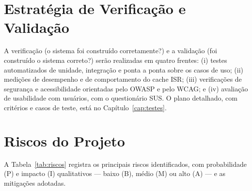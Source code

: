\section{Estratégia de Verificação e Validação}\label{sec:estrategia-vv}

A verificação (o sistema foi construído corretamente?) e a validação (foi construído o sistema correto?) serão realizadas em quatro frentes: (i) testes automatizados de unidade, integração e ponta a ponta sobre os casos de uso; (ii) medições de desempenho e de comportamento do cache ISR; (iii) verificações de segurança e acessibilidade orientadas pelo OWASP e pelo WCAG; e (iv) avaliação de usabilidade com usuários, com o questionário SUS. O plano detalhado, com critérios e casos de teste, está no Capítulo~\ref{cap:testes}.

\section{Riscos do Projeto}\label{sec:riscos}

A Tabela~\ref{tab:riscos} registra os principais riscos identificados, com probabilidade (P) e impacto (I) qualitativos --- baixo (B), médio (M) ou alto (A) --- e as mitigações adotadas.

